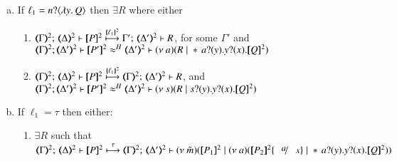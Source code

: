 \begin{proposition}
\begin{enumerate}[1.]
\begin{enumerate}[a)]
			\item
				If   
				$\ell_1 = n ? \langle \lambda y.\,Q \rangle$
				then $\exists R$ where
				either
				\begin{enumerate}[-]
					\item 
						$\tmap{\Gamma}{2};\, \tmap{\Delta}{2} \proves \pmap{P}{2} 
						\hby{\mapa{\ell_1}^{2}}
						\Gamma';\, \tmap{\Delta'}{2} \proves  R$, for some $ \Gamma'$
						and \\ 
						$\horel{\tmap{\Gamma}{2}}{\tmap{\Delta'}{2}}{\pmap{P'}{2}}{\wb}{\tmap{\Delta'}{2}}{\newsp{a}{R \Par \repl{} \binp{a}{y} \binp{y}{x} \pmap{Q}{2}}}$
					\item 
						$\tmap{\Gamma}{2};\, \tmap{\Delta}{2} \proves \pmap{P}{2}
						\hby{\mapa{\ell_1}^{2}}
						\tmap{\Gamma}{2};\, \tmap{\Delta'}{2} \proves R$, 
						and \\ 
						$\horel{\tmap{\Gamma}{2}}{\tmap{\Delta'}{2}}{\pmap{P'}{2}}{\wb}{\tmap{\Delta'}{2}}{\newsp{s}{R \Par \binp{s}{y} \binp{y}{x} \pmap{Q}{2}}}$  		
				\end{enumerate}

			\item	If
				$\ell_1 = \tau$ then either:
	
				\begin{enumerate}[-]
					\item	$\exists R$ such that
						$\tmap{\Gamma}{2};\, \tmap{\Delta}{2} \proves \pmap{P}{2}
						\hby{\tau}
						\tmap{\Gamma}{2};\, \tmap{\Delta'}{2} \proves \newsp{\tilde{m}}{\pmap{P_1}{2} \Par \newsp{a}
						{\pmap{P_2}{2}\subst{a}{x} \Par \repl{} \binp{a}{y} \binp{y}{x} \pmap{Q}{2}}}$


\end{enumerate}
\end{enumerate}
\end{enumerate}
\end{proposition}
